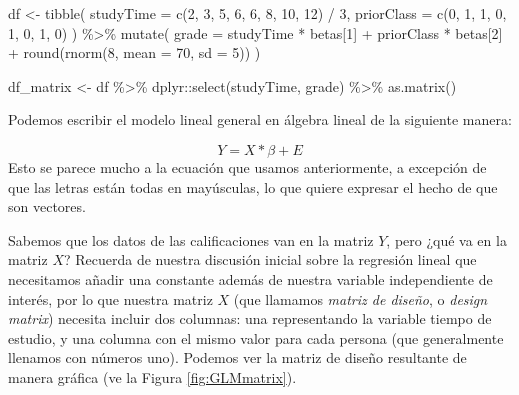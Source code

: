 \documentclass[
  12pt,
]{book}
\newenvironment{Shaded}{\begin{snugshade}}{\end{snugshade}}
\newcommand{\AttributeTok}[1]{\textcolor[rgb]{0.77,0.63,0.00}{#1}}
\newcommand{\DecValTok}[1]{\textcolor[rgb]{0.00,0.00,0.81}{#1}}
\newcommand{\FunctionTok}[1]{\textcolor[rgb]{0.00,0.00,0.00}{#1}}
\newcommand{\NormalTok}[1]{#1}
\newcommand{\OtherTok}[1]{\textcolor[rgb]{0.56,0.35,0.01}{#1}}
\newcommand{\SpecialCharTok}[1]{\textcolor[rgb]{0.00,0.00,0.00}{#1}}
\theoremstyle{definition}
\theoremstyle{definition}
\theoremstyle{definition}
\theoremstyle{remark}
\begin{document}
\begin{Shaded}
\begin{Highlighting}[]
\NormalTok{df }\OtherTok{\textless{}{-}}
  \FunctionTok{tibble}\NormalTok{(}
    \AttributeTok{studyTime =} \FunctionTok{c}\NormalTok{(}\DecValTok{2}\NormalTok{, }\DecValTok{3}\NormalTok{, }\DecValTok{5}\NormalTok{, }\DecValTok{6}\NormalTok{, }\DecValTok{6}\NormalTok{, }\DecValTok{8}\NormalTok{, }\DecValTok{10}\NormalTok{, }\DecValTok{12}\NormalTok{) }\SpecialCharTok{/} \DecValTok{3}\NormalTok{,}
    \AttributeTok{priorClass =} \FunctionTok{c}\NormalTok{(}\DecValTok{0}\NormalTok{, }\DecValTok{1}\NormalTok{, }\DecValTok{1}\NormalTok{, }\DecValTok{0}\NormalTok{, }\DecValTok{1}\NormalTok{, }\DecValTok{0}\NormalTok{, }\DecValTok{1}\NormalTok{, }\DecValTok{0}\NormalTok{)}
\NormalTok{  ) }\SpecialCharTok{\%\textgreater{}\%}
  \FunctionTok{mutate}\NormalTok{(}
    \AttributeTok{grade =} 
\NormalTok{      studyTime }\SpecialCharTok{*}\NormalTok{ betas[}\DecValTok{1}\NormalTok{] }\SpecialCharTok{+} 
\NormalTok{      priorClass }\SpecialCharTok{*}\NormalTok{ betas[}\DecValTok{2}\NormalTok{] }\SpecialCharTok{+} 
      \FunctionTok{round}\NormalTok{(}\FunctionTok{rnorm}\NormalTok{(}\DecValTok{8}\NormalTok{, }\AttributeTok{mean =} \DecValTok{70}\NormalTok{, }\AttributeTok{sd =} \DecValTok{5}\NormalTok{))}
\NormalTok{  )}

\NormalTok{df\_matrix }\OtherTok{\textless{}{-}} 
\NormalTok{  df }\SpecialCharTok{\%\textgreater{}\%}
\NormalTok{  dplyr}\SpecialCharTok{::}\FunctionTok{select}\NormalTok{(studyTime, grade) }\SpecialCharTok{\%\textgreater{}\%}
  \FunctionTok{as.matrix}\NormalTok{()}
\end{Highlighting}
\end{Shaded}

Podemos escribir el modelo lineal general en álgebra lineal de la siguiente manera:

\[
Y = X*\beta + E
\]
Esto se parece mucho a la ecuación que usamos anteriormente, a excepción de que las letras están todas en mayúsculas, lo que quiere expresar el hecho de que son vectores.

Sabemos que los datos de las calificaciones van en la matriz \(Y\), pero ¿qué va en la matriz \(X\)? Recuerda de nuestra discusión inicial sobre la regresión lineal que necesitamos añadir una constante además de nuestra variable independiente de interés, por lo que nuestra matriz \(X\) (que llamamos \emph{matriz de diseño}, o \emph{design matrix}) necesita incluir dos columnas: una representando la variable tiempo de estudio, y una columna con el mismo valor para cada persona (que generalmente llenamos con números uno). Podemos ver la matriz de diseño resultante de manera gráfica (ve la Figura \ref{fig:GLMmatrix}).
\end{document}
